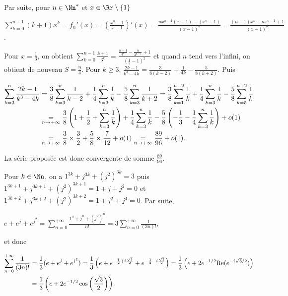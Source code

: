 {{Par suite, pour $n\in\Nn^*$ et $x\in\Rr\setminus\{1\}$

\begin{center}
$\sum_{k=0}^{n-1}(k+1)x^k=f_n'(x)=\left(\frac{x^n-1}{x-1}\right)'(x)=\frac{nx^{n-1}(x-1)-(x^n-1)}{(x-1)^2}=\frac{(n-1)x^n-nx^{n-1}+1}{(x-1)^2}$.
\end{center}

Pour $x=\frac{1}{3}$, on obtient  $\sum_{k=0}^{n-1}\frac{k+1}{3^k}=\frac{\frac{n-1}{3^n}-\frac{n}{3^{n-1}}+1}{\left(\frac{1}{3}-1\right)^2}$ et quand $n$ tend vers l'infini, on obtient de nouveau $S=\frac{9}{4}$.
Pour $k\geqslant3$, $\frac{2k-1}{k^3-4k}=\frac{3}{8(k-2)}+\frac{1}{4k}-\frac{5}{8(k+2)}$. Puis

\begin{align*}\ensuremath
\sum_{k=3}^{n}\frac{2k-1}{k^3-4k}&=\frac{3}{8}\sum_{k=3}^{n}\frac{1}{k-2}+\frac{1}{4}\sum_{k=3}^{n}\frac{1}{k}-\frac{5}{8}\sum_{k=3}^{n}\frac{1}{k+2}=\frac{3}{8}\sum_{k=1}^{n-2}\frac{1}{k}+\frac{1}{4}\sum_{k=3}^{n}\frac{1}{k}-\frac{5}{8}\sum_{k=5}^{n+2}\frac{1}{k}\\
 &\underset{n\rightarrow+\infty}{=}\frac{3}{8}\left(1+\frac{1}{2}+\sum_{k=3}^{n}\frac{1}{k}\right)+\frac{1}{4}\sum_{k=3}^{n}\frac{1}{k}-\frac{5}{8}\left(-\frac{1}{3}-\frac{1}{4}\sum_{k=3}^{n}\frac{1}{k}\right)+o(1)\\
 &\underset{n\rightarrow+\infty}{=}\frac{3}{8}\times\frac{3}{2}+\frac{5}{8}\times\frac{7}{12}+o(1)\underset{n\rightarrow+\infty}{=}\frac{89}{96}+ o(1) .
\end{align*}

La série proposée est donc convergente de somme $\frac{89}{96}$.

\begin{center}
\end{center}
Pour $k\in\Nn$, on a $1^{3k}+j^{3k}+(j^2)^{3k}=3$ puis $1^{3k+1}+j^{3k+1}+(j^2)^{3k+1} =1+j+j^2= 0$ et $1^{3k+2}+j^{3k+2}+(j^2)^{3k+2}=1+j^2 + j^4 = 0$. Par suite,

\begin{center}
$e+e^j+e^{j^2}=\sum_{n=0}^{+\infty}\frac{1^n+j^n+(j^2)^n}{n!}=3\sum_{n=0}^{+\infty}\frac{1}{(3n)!}$,
\end{center}

et donc

\begin{align*}\ensuremath
\sum_{n=0}^{+\infty}\frac{1}{(3n)!}&=\frac{1}{3}(e+e^j+e^{j^2})=\frac{1}{3}\left(e+e^{-\frac{1}{2}+i\frac{\sqrt{3}}{2}}+e^{-\frac{1}{2}-i\frac{\sqrt{3}}{2}}\right) =\frac{1}{3}\left(e + 2e^{-1/2}\text{Re}(e^{-i\sqrt{3}/2})\right)\\
 &=\frac{1}{3}\left(e +2e^{-1/2}\cos\left(\frac{\sqrt{3}}{2}\right)\right).
\end{align*}

}}
